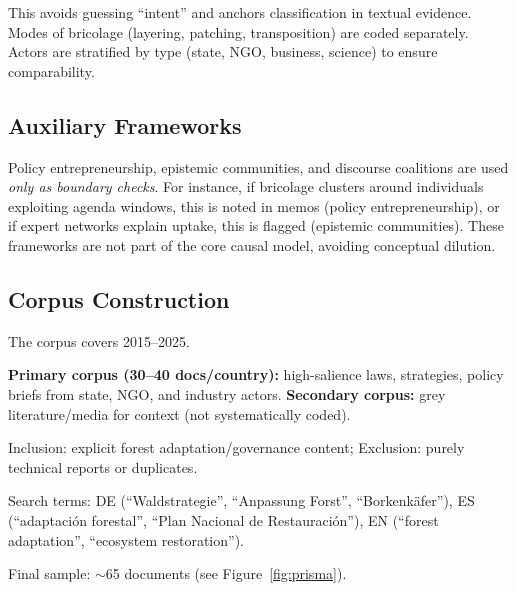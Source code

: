 This avoids guessing ``intent'' and anchors classification in textual evidence.  
Modes of bricolage (layering, patching, transposition) are coded separately.  
Actors are stratified by type (state, NGO, business, science) to ensure comparability.

\subsection*{Auxiliary Frameworks}
Policy entrepreneurship, epistemic communities, and discourse coalitions are used 
\emph{only as boundary checks}. For instance, if bricolage clusters around individuals 
exploiting agenda windows, this is noted in memos (policy entrepreneurship), or if 
expert networks explain uptake, this is flagged (epistemic communities). These frameworks 
are not part of the core causal model, avoiding conceptual dilution.

\subsection*{Corpus Construction}
The corpus covers 2015–2025.  

\textbf{Primary corpus (30–40 docs/country):} high-salience laws, strategies, 
policy briefs from state, NGO, and industry actors.  
\textbf{Secondary corpus:} grey literature/media for context (not systematically coded).  

Inclusion: explicit forest adaptation/governance content; Exclusion: purely 
technical reports or duplicates.  

Search terms: DE (``Waldstrategie'', ``Anpassung Forst'', ``Borkenkäfer''),  
ES (``adaptación forestal'', ``Plan Nacional de Restauración''),  
EN (``forest adaptation'', ``ecosystem restoration'').  

Final sample: $\sim$65 documents (see Figure~\ref{fig:prisma}).  

